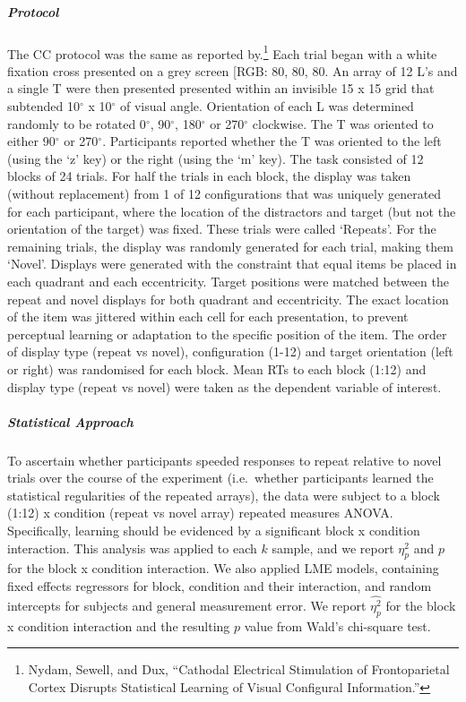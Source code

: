 \documentclass[
  12pt,
]{article}
\begin{document}
\hypertarget{protocol-2}{%
\subparagraph{Protocol}\label{protocol-2}}

The CC protocol was the same as reported by.\footnote{Nydam, Sewell, and Dux, ``Cathodal Electrical Stimulation of Frontoparietal Cortex Disrupts Statistical Learning of Visual Configural Information.''} Each trial began with a white fixation cross presented on a grey screen {[}RGB: 80, 80, 80. An array of 12 L's and a single T were then presented presented within an invisible 15 x 15 grid that subtended 10\(^\circ\) x 10\(^\circ\) of visual angle. Orientation of each L was determined randomly to be rotated 0\(^\circ\), 90\(^\circ\), 180\(^\circ\) or 270\(^\circ\) clockwise. The T was oriented to either 90\(^\circ\) or 270\(^\circ\). Participants reported whether the T was oriented to the left (using the `z' key) or the right (using the `m' key). The task consisted of 12 blocks of 24 trials. For half the trials in each block, the display was taken (without replacement) from 1 of 12 configurations that was uniquely generated for each participant, where the location of the distractors and target (but not the orientation of the target) was fixed. These trials were called `Repeats'. For the remaining trials, the display was randomly generated for each trial, making them `Novel'. Displays were generated with the constraint that equal items be placed in each quadrant and each eccentricity. Target positions were matched between the repeat and novel displays for both quadrant and eccentricity. The exact location of the item was jittered within each cell for each presentation, to prevent perceptual learning or adaptation to the specific position of the item. The order of display type (repeat vs novel), configuration (1-12) and target orientation (left or right) was randomised for each block. Mean RTs to each block (1:12) and display type (repeat vs novel) were taken as the dependent variable of interest.

\hypertarget{statistical-approach-1}{%
\subparagraph{Statistical Approach}\label{statistical-approach-1}}

To ascertain whether participants speeded responses to repeat relative to novel trials over the course of the experiment (i.e.~whether participants learned the statistical regularities of the repeated arrays), the data were subject to a block (1:12) x condition (repeat vs novel array) repeated measures ANOVA. Specifically, learning should be evidenced by a significant block x condition interaction. This analysis was applied to each \(k\) sample, and we report \(\eta_{p}^{2}\) and \(p\) for the block x condition interaction. We also applied LME models, containing fixed effects regressors for block, condition and their interaction, and random intercepts for subjects and general measurement error. We report \(\hat{\eta_{p}^{2}}\) for the block x condition interaction and the resulting \(p\) value from Wald's chi-square test.
\end{document}

